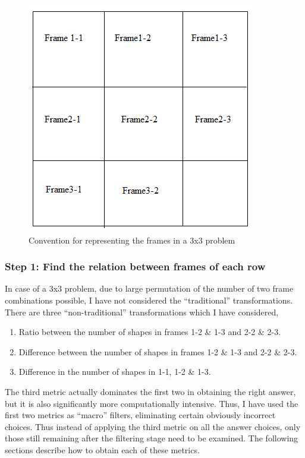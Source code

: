 \documentclass[10pt, letter]{article}
\begin{document}
\begin{figure}[h!]
  \centering
    \includegraphics[scale = 0.5]{Images/Fig5}
    \caption{Convention for representing the frames in a 3x3 problem}
  \label{fig5}
\end{figure}

\subsubsection*{Step 1: Find the relation between frames of each row}
In case of a 3x3 problem, due to large permutation of the number of two frame combinations possible, I have not considered the ``traditional'' transformations. There are three ``non-traditional'' transformations which I have considered,
\begin{enumerate}
	\item Ratio between the number of shapes in frames 1-2 \& 1-3 and 2-2 \& 2-3.
	\item Difference between the number of shapes in frames 1-2 \& 1-3 and 2-2 \& 2-3.
	\item Difference in the number of shapes in 1-1, 1-2 \& 1-3.
\end{enumerate}
The third metric actually dominates the first two in obtaining the right answer, but it is also significantly more computationally intensive. Thus, I have used the first two metrics as ``macro'' filters, eliminating certain obviously incorrect choices. Thus instead of applying the third metric on all the answer choices, only those still remaining after the filtering stage need to be examined. The following sections describe how to obtain each of these metrics.
\end{document}

